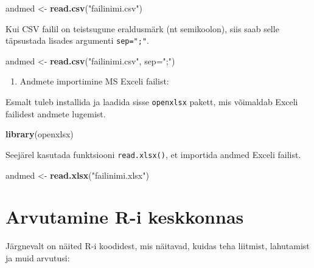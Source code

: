 \documentclass[
]{book}
\newenvironment{Shaded}{\begin{snugshade}}{\end{snugshade}}
\newcommand{\AttributeTok}[1]{\textcolor[rgb]{0.13,0.29,0.53}{#1}}
\newcommand{\FunctionTok}[1]{\textcolor[rgb]{0.13,0.29,0.53}{\textbf{#1}}}
\newcommand{\NormalTok}[1]{#1}
\newcommand{\OtherTok}[1]{\textcolor[rgb]{0.56,0.35,0.01}{#1}}
\newcommand{\StringTok}[1]{\textcolor[rgb]{0.31,0.60,0.02}{#1}}
\providecommand{\tightlist}{%
  \setlength{\itemsep}{0pt}\setlength{\parskip}{0pt}}
\renewenvironment{Shaded} {\begin{snugshade}\footnotesize} {\end{snugshade}}
\begin{document}
\begin{Shaded}
\begin{Highlighting}[]
\NormalTok{andmed }\OtherTok{\textless{}{-}} \FunctionTok{read.csv}\NormalTok{(}\StringTok{"failinimi.csv"}\NormalTok{)}
\end{Highlighting}
\end{Shaded}

Kui CSV failil on teistsugune eraldusmärk (nt semikoolon), siis saab selle täpsustada lisades argumenti \texttt{sep=";"}.

\begin{Shaded}
\begin{Highlighting}[]
\NormalTok{andmed }\OtherTok{\textless{}{-}} \FunctionTok{read.csv}\NormalTok{(}\StringTok{"failinimi.csv"}\NormalTok{, }\AttributeTok{sep=}\StringTok{";"}\NormalTok{)}
\end{Highlighting}
\end{Shaded}

\begin{enumerate}
\def\labelenumi{\arabic{enumi}.}
\setcounter{enumi}{1}
\tightlist
\item
  Andmete importimine MS Exceli failist:
\end{enumerate}

Esmalt tuleb installida ja laadida sisse \texttt{openxlsx} pakett, mis võimaldab Exceli failidest andmete lugemist.

\begin{Shaded}
\begin{Highlighting}[]
\FunctionTok{library}\NormalTok{(openxlsx)}
\end{Highlighting}
\end{Shaded}

Seejärel kasutada funktsiooni \texttt{read.xlsx()}, et importida andmed Exceli failist.

\begin{Shaded}
\begin{Highlighting}[]
\NormalTok{andmed }\OtherTok{\textless{}{-}} \FunctionTok{read.xlsx}\NormalTok{(}\StringTok{"failinimi.xlsx"}\NormalTok{)}
\end{Highlighting}
\end{Shaded}

\section{Arvutamine R-i keskkonnas}\label{arvutamine-r-i-keskkonnas}

Järgnevalt on näited R-i koodidest, mis näitavad, kuidas teha liitmist, lahutamist ja muid arvutusi:
\end{document}
